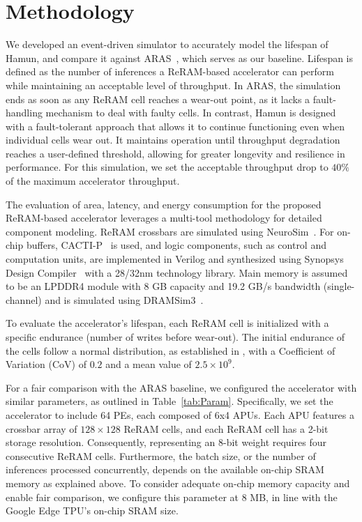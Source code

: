 
\section{Methodology}\label{s:Methodology}
We developed an event-driven simulator to accurately model the lifespan of Hamun, and compare it against ARAS~\cite{ARAS}, which serves as our baseline. Lifespan is defined as the number of inferences a ReRAM-based accelerator can perform while maintaining an acceptable level of throughput. In ARAS, the simulation ends as soon as any ReRAM cell reaches a wear-out point, as it lacks a fault-handling mechanism to deal with faulty cells. In contrast, Hamun is designed with a fault-tolerant approach that allows it to continue functioning even when individual cells wear out. It maintains operation until throughput degradation reaches a user-defined threshold, allowing for greater longevity and resilience in performance. For this simulation, we set the acceptable throughput drop to $40\%$ of the maximum accelerator throughput.

The evaluation of area, latency, and energy consumption for the proposed ReRAM-based accelerator leverages a multi-tool methodology for detailed component modeling. ReRAM crossbars are simulated using NeuroSim~\cite{Neurosim_github}. For on-chip buffers, CACTI-P~\cite{cacti-p} is used, and logic components, such as control and computation units, are implemented in Verilog and synthesized using Synopsys Design Compiler~\cite{Design_compiler} with a 28/32nm technology library. Main memory is assumed to be an LPDDR4 module with 8 GB capacity and 19.2 GB/s bandwidth (single-channel) and is simulated using DRAMSim3~\cite{DRAMsim3}.

To evaluate the accelerator's lifespan, each ReRAM cell is initialized with a specific endurance (number of writes before wear-out). The initial endurance of the cells follow a normal distribution, as established in \cite{Realizing}, with a Coefficient of Variation (CoV) of $0.2$ and a mean value of $2.5\times10^9$.

For a fair comparison with the ARAS baseline, we configured the accelerator with similar parameters, as outlined in Table~\ref{tab:Param}. Specifically, we set the accelerator to include 64 PEs, each composed of 6x4 APUs. Each APU features a crossbar array of $128\times128$ ReRAM cells, and each ReRAM cell has a 2-bit storage resolution. Consequently, representing an 8-bit weight requires four consecutive ReRAM cells. Furthermore, the batch size, or the number of inferences processed concurrently, depends on the available on-chip SRAM memory as explained above. To consider adequate on-chip memory capacity and enable fair comparison, we configure this parameter at 8 MB, in line with the Google Edge TPU’s on-chip SRAM size.

